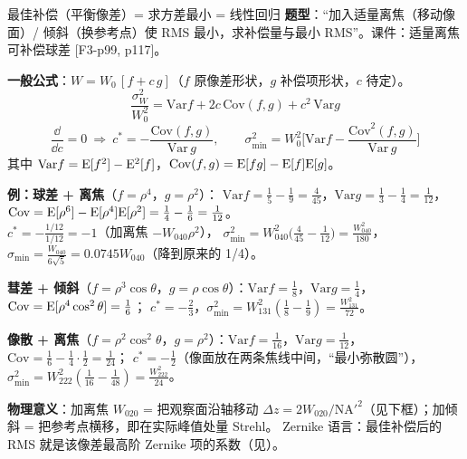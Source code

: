 \begin{recipe}{最佳补偿（平衡像差）= 求方差最小 = 线性回归}\label{rc:balance}
\textbf{题型}：“加入适量离焦（移动像面）/ 倾斜（换参考点）使 RMS 最小，求补偿量与最小 RMS”。课件：适量离焦可补偿球差 [F3-p99, p117]。

\textbf{一般公式}：$W=W_0\,[f+c\,g]$（$f$ 原像差形状，$g$ 补偿项形状，$c$ 待定）。
\[
\frac{\sigma_W^2}{W_0^2}=\mathrm{Var}f+2c\,\mathrm{Cov}(f,g)+c^2\,\mathrm{Var}g
\]
\[
\frac{\dd}{\dd c}=0\ \Rightarrow\ \boxed{c^*=-\frac{\mathrm{Cov}(f,g)}{\mathrm{Var}\,g}},\qquad
\sigma_{\min}^2=W_0^2\Big[\mathrm{Var}f-\frac{\mathrm{Cov}^2(f,g)}{\mathrm{Var}\,g}\Big]
\]
其中 $\mathrm{Var}f=\mathrm{E}[f^2]-\mathrm{E}^2[f]$，$\mathrm{Cov}(f,g)=\mathrm{E}[fg]-\mathrm{E}[f]\mathrm{E}[g]$。

\textbf{例：球差 + 离焦}（$f=\rho^4$，$g=\rho^2$）：
$\mathrm{Var}f=\frac15-\frac19=\frac4{45}$，$\mathrm{Var}g=\frac13-\frac14=\frac1{12}$，
$\mathrm{Cov}=\mathrm{E}[\rho^6]-\mathrm{E}[\rho^4]\mathrm{E}[\rho^2]=\frac14-\frac16=\frac1{12}$。\\
$c^*=-\frac{1/12}{1/12}=-1$（加离焦 $-W_{040}\rho^2$），
$\sigma_{\min}^2=W_{040}^2\big(\frac4{45}-\frac{1}{12}\big)=\frac{W_{040}^2}{180}$，$\sigma_{\min}=\frac{W_{040}}{6\sqrt5}=0.0745W_{040}$（降到原来的 1/4）。

\textbf{彗差 + 倾斜}（$f=\rho^3\cos\theta$，$g=\rho\cos\theta$）：$\mathrm{Var}f=\frac18$，$\mathrm{Var}g=\frac14$，$\mathrm{Cov}=\mathrm{E}[\rho^4\cos^2\theta]=\frac16$；
$c^*=-\frac23$，$\sigma_{\min}^2=W_{131}^2(\frac18-\frac19)=\frac{W_{131}^2}{72}$。

\textbf{像散 + 离焦}（$f=\rho^2\cos^2\theta$，$g=\rho^2$）：$\mathrm{Var}f=\frac1{16}$，$\mathrm{Var}g=\frac1{12}$，$\mathrm{Cov}=\frac16-\frac14\cdot\frac12=\frac1{24}$；
$c^*=-\frac12$（像面放在两条焦线中间，“最小弥散圆”），$\sigma_{\min}^2=W_{222}^2(\frac1{16}-\frac1{48})=\frac{W_{222}^2}{24}$。

\textbf{物理意义}：加离焦 $W_{020}$ = 把观察面沿轴移动 $\Delta z=2W_{020}/\mathrm{NA}'^2$（见下框）；加倾斜 = 把参考点横移，即在实际峰值处量 Strehl。
Zernike 语言：最佳补偿后的 RMS 就是该像差最高阶 Zernike 项的系数（见\pageref{sec:zernike}）。
\end{recipe}

